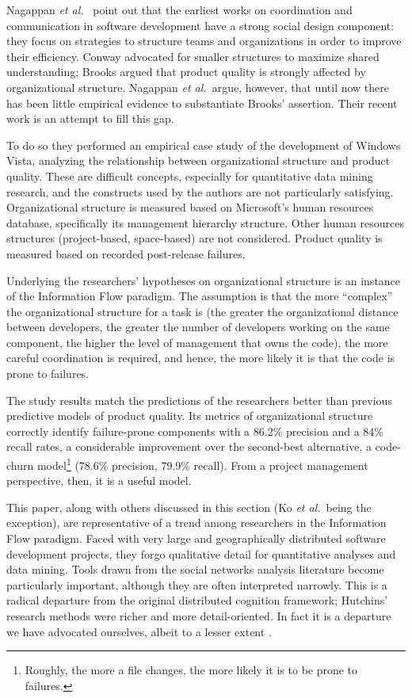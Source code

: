 Nagappan \emph{et al.}\  point out that the earliest works on coordination and communication in software development have a strong social design component: they focus on strategies to structure teams and organizations in order to improve their efficiency. Conway  advocated for smaller structures to maximize shared understanding; Brooks  argued that product quality is strongly affected by organizational structure. Nagappan \emph{et al.}\ argue, however, that until now there has been little empirical evidence to substantiate Brooks' assertion. Their recent work is an attempt to fill this gap.

To do so they performed an empirical case study of the development of Windows Vista, analyzing the relationship between organizational structure and product quality. These are difficult concepts, especially for quantitative data mining research, and the constructs used by the authors are not particularly satisfying. Organizational structure is measured based on Microsoft's human resources database, specifically its management hierarchy structure. Other human resources structures (project-based, space-based) are not considered. Product quality is measured based on recorded post-release failures.

Underlying the researchers' hypotheses on organizational structure is an instance of the Information Flow paradigm. The assumption is that the more ``complex'' the organizational structure for a task is (the greater the organizational distance between developers, the greater the number of developers working on the same component, the higher the level of management that owns the code), the more careful coordination is required, and hence, the more likely it is that the code is prone to failures.

The study results match the predictions of the researchers better than previous predictive models of product quality. Its metrics of organizational structure correctly identify failure-prone components with a 86.2\% precision and a 84\% recall rates, a considerable improvement over the second-best alternative, a code-churn model\footnote{Roughly, the more a file changes, the more likely it is to be prone to failures.} (78.6\% precision, 79.9\% recall). From a project management perspective, then, it is a useful model.

This paper, along with others discussed in this section (Ko \emph{et al.}\ being the exception), are representative of a trend among researchers in the Information Flow paradigm. Faced with very large and geographically distributed software development projects, they forgo qualitative detail for quantitative analyses and data mining. Tools drawn from the social networks analysis literature become particularly important, although they are often interpreted narrowly. This is a radical departure from the original distributed cognition framework; Hutchins' research methods were richer and more detail-oriented. In fact it is a departure we have advocated ourselves, albeit to a lesser extent \cite{Aranda2006}.

